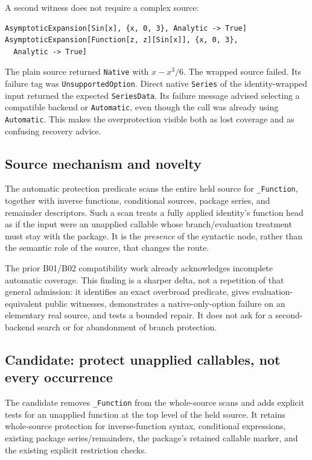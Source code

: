 \documentclass[11pt]{article}
\newcommand{\code}[1]{\texttt{#1}}
\begin{document}
A second witness does not require a complex source:
\begin{lstlisting}
AsymptoticExpansion[Sin[x], {x, 0, 3}, Analytic -> True]
AsymptoticExpansion[Function[z, z][Sin[x]], {x, 0, 3},
  Analytic -> True]
\end{lstlisting}
The plain source returned \code{Native} with $x-x^3/6$. The wrapped source failed. Its failure tag was \code{UnsupportedOption}. Direct native \code{Series} of the identity-wrapped input returned the expected \code{SeriesData}. Its failure message advised selecting a compatible backend or \code{Automatic}, even though the call was already using \code{Automatic}. This makes the overprotection visible both as lost coverage and as confusing recovery advice.

\subsection{Source mechanism and novelty}
The automatic protection predicate scans the entire held source for \code{\_Function}, together with inverse functions, conditional sources, package series, and remainder descriptors. Such a scan treats a fully applied identity's function head as if the input were an unapplied callable whose branch/evaluation treatment must stay with the package. It is the \emph{presence} of the syntactic node, rather than the semantic role of the source, that changes the route.\cite{bridge}

The prior B01/B02 compatibility work already acknowledges incomplete automatic coverage. This finding is a sharper delta, not a repetition of that general admission: it identifies an exact overbroad predicate, gives evaluation-equivalent public witnesses, demonstrates a native-only-option failure on an elementary real source, and tests a bounded repair. It does not ask for a second-backend search or for abandonment of branch protection.

\subsection{Candidate: protect unapplied callables, not every occurrence}
The candidate removes \code{\_Function} from the whole-source scans and adds explicit tests for an unapplied function at the top level of the held source. It retains whole-source protection for inverse-function syntax, conditional expressions, existing package series/remainders, the package's retained callable marker, and the existing explicit restriction checks.
\end{document}
